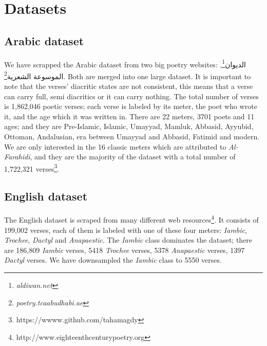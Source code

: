 \documentclass[12pt]{report}
\begin{document}



\section*{Datasets}
\subsection*{Arabic dataset}
We have scrapped the Arabic dataset from two big poetry websites:
\textarabic{الديوان}\footnote{\textit{aldiwan.net}}, \textarabic{الموسوعة
الشعرية}\footnote{\textit{poetry.tcaabudhabi.ae}}. Both are merged into one large
dataset. It is important to note that the verses' diacritic states are not
consistent, this means that a verse can carry full, semi diacritics or it can
carry nothing. The total number of verses is  1,862,046 poetic verses; each verse is
labeled by its meter, the poet who wrote it, and the
age which it was written in. There are 22 meters, 3701 poets and 11
ages; and they are Pre-Islamic, Islamic, Umayyad, Mamluk, Abbasid, Ayyubid, Ottoman,
Andalusian, era between Umayyad and Abbasid, Fatimid and modern.  We are only
interested  in the 16 classic meters which are attributed to \textit{Al-Farahidi},
and they are the majority of the dataset with a total number of 1,722,321
verses\footnote{https://wwww.github.com/tahamagdy}.


\begin{center}


\label{data_size}
\end{center}


\subsection*{English dataset}
The English dataset is scraped from many different web
resources\footnote{http://www.eighteenthcenturypoetry.org}. It consists of 199,002
verses, each of them is labeled with one of these four meters: \textit{Iambic},
\textit{Trochee}, \textit{Dactyl} and \textit{Anapaestic}.  The \textit{Iambic}
class dominates the dataset; there are  186,809 \textit{Iambic} verses, 5418
\textit{Trochee} verses, 5378  \textit{Anapaestic} verses, 1397 \textit{Dactyl}
verses.  We have downsampled the \textit{Iambic} class to 5550 verses.
\end{document}
